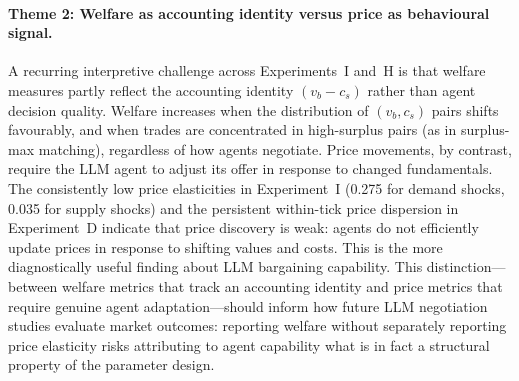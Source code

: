 \paragraph{Theme 2: Welfare as accounting identity versus price as behavioural signal.}
A recurring interpretive challenge across Experiments~I and~H is that welfare measures partly reflect the accounting identity $(v_b - c_s)$ rather than agent decision quality.  Welfare increases when the distribution of $(v_b, c_s)$ pairs shifts favourably, and when trades are concentrated in high-surplus pairs (as in surplus-max matching), regardless of how agents negotiate.  Price movements, by contrast, require the LLM agent to adjust its offer in response to changed fundamentals.  The consistently low price elasticities in Experiment~I (0.275 for demand shocks, 0.035 for supply shocks) and the persistent within-tick price dispersion in Experiment~D indicate that price discovery is weak: agents do not efficiently update prices in response to shifting values and costs.  This is the more diagnostically useful finding about LLM bargaining capability.  This distinction---between welfare metrics that track an accounting identity and price metrics that require genuine agent adaptation---should inform how future LLM negotiation studies evaluate market outcomes: reporting welfare without separately reporting price elasticity risks attributing to agent capability what is in fact a structural property of the parameter design.

